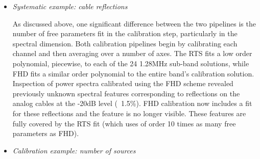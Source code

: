 \documentclass[twolcolumn,iop]{emulateapj}
\begin{document}
\begin{itemize}

\item \emph{ Systematic example: cable reflections}

As discussed above, one significant difference between the two pipelines is the number of free parameters fit in the calibration step, particularly in the spectral dimension.  Both calibration pipelines begin by calibrating each channel and then averaging over a number of axes.  The RTS fits a low order polynomial, piecewise, to each of the 24 1.28MHz sub-band solutions, while FHD fits a similar order polynomial to the entire  band's calibration solution.  Inspection of power spectra calibrated using the FHD scheme revealed previously unknown spectral features corresponding to reflections on the analog cables at the -20dB level (~1.5\%). FHD calibration now includes a fit for these reflections and the feature is no longer visible. These features are fully covered by the RTS fit (which uses of order 10 times as many free parameters as FHD). 

\item \emph{Calibration example: number of sources}


\end{itemize}
\end{document}
